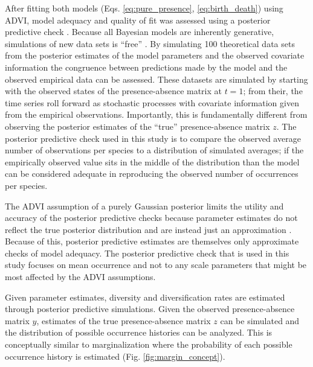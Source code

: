 \documentclass[12pt,letterpaper]{article}
\begin{document}
After fitting both models (Eqs. \ref{eq:pure_presence}, \ref{eq:birth_death}) using ADVI, model adequacy and quality of fit was assessed using a posterior predictive check \citep{Gelman2013d}. Because all Bayesian models are inherently generative, simulations of new data sets is ``free'' \citep{Gelman2013d,McElreath2016}. By simulating 100 theoretical data sets from the posterior estimates of the model parameters and the observed covariate information the congruence between predictions made by the model and the observed empirical data can be assessed. These datasets are simulated by starting with the observed states of the presence-absence matrix at \(t = 1\); from their, the time series roll forward as stochastic processes with covariate information given from the empirical observations. Importantly, this is fundamentally different from observing the posterior estimates of the ``true'' presence-absence matrix \(z\). The posterior predictive check used in this study is to compare the observed average number of observations per species to a distribution of simulated averages; if the empirically observed value sits in the middle of the distribution than the model can be considered adequate in reproducing the observed number of occurrences per species. 

The ADVI assumption of a purely Gaussian posterior limits the utility and accuracy of the posterior predictive checks because parameter estimates do not reflect the true posterior distribution and are instead just an approximation \citep{Gelman2013d}. Because of this, posterior predictive estimates are themselves only approximate checks of model adequacy. The posterior predictive check that is used in this study focuses on mean occurrence and not to any scale parameters that might be most affected by the ADVI assumptions.


Given parameter estimates, diversity and diversification rates are estimated through posterior predictive simulations. Given the observed presence-absence matrix \(y\), estimates of the true presence-absence matrix \(z\) can be simulated and the distribution of possible occurrence histories can be analyzed. This is conceptually similar to marginalization where the probability of each possible occurrence history is estimated (Fig. \ref{fig:margin_concept}). 
\end{document}
